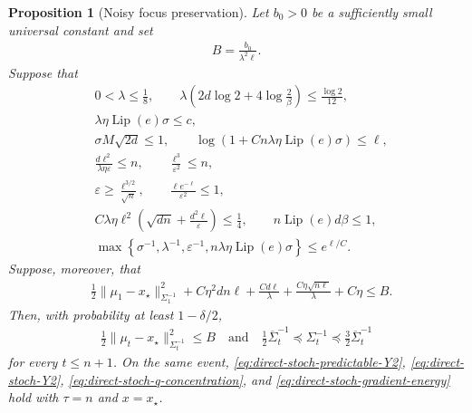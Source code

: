 \documentclass{article}
\theoremstyle{plain}
\newtheorem{proposition}[theorem]{Proposition}
\theoremstyle{definition}
\theoremstyle{plain}
\begin{document}
\begin{proposition}[Noisy focus preservation]
    \label{prop:direct-stoch-focus}
    Let $b_0>0$ be a sufficiently small universal constant and set
    \begin{align}
        B=\frac{b_0}{\lambda^2\ell}.
        \label{eq:direct-stoch-focus-B}
    \end{align}
    Suppose that
    \begin{align}
         & 0<\lambda\leq\frac18,
        \qquad
        \lambda\left(
        2d\log2+4\log\frac2\beta
        \right)\leq\frac{\log2}{12},
        \nonumber                                        \\
         & \lambda\eta\operatorname{Lip}(e)\sigma\leq c,
        \label{eq:direct-stoch-focus-basic-conditions}
        \\
         & \sigma M\sqrt{2d}\leq1,
        \qquad
        \log\left(
        1+Cn\lambda\eta\operatorname{Lip}(e)\sigma
        \right)\leq\ell,
        \nonumber                                        \\
         & \frac{d\ell^2}{\lambda\eta\varepsilon}\leq n,
        \qquad
        \frac{\ell^3}{\varepsilon^2}\leq n,
        \nonumber                                        \\
         & \varepsilon\geq\frac{\ell^{3/2}}{\sqrt n},
        \qquad
        \frac{\ell e^{-\ell}}{\varepsilon^2}\leq1,
        \label{eq:direct-stoch-focus-moment-conditions}
        \\
         & C\lambda\eta\ell^2\left(
        \sqrt{dn}+\frac{d^2\ell}{\varepsilon}
        \right)\leq\frac14,
        \qquad
        n\operatorname{Lip}(e)d\beta\leq1,
        \label{eq:direct-stoch-focus-matrix-condition}
        \\
         & \max\left\{
        \sigma^{-1},\lambda^{-1},\varepsilon^{-1},
        n\lambda\eta\operatorname{Lip}(e)\sigma
        \right\}
        \leq e^{\ell/C}.
        \label{eq:direct-stoch-focus-crude-size}
    \end{align}
    Suppose, moreover, that
    \begin{align}
         & \frac12\|\mu_1-x_\star\|_{\Sigma_1^{-1}}^2
        +C\eta^2dn\ell
        +\frac{Cd\ell}{\lambda}
        +\frac{C\eta\sqrt{n\ell}}{\lambda}
        +C\eta
        \leq B.
        \label{eq:direct-stoch-focus-budget}
    \end{align}
    Then, with probability at least $1-\delta/2$,
    \begin{align}
        \frac12\|\mu_t-x_\star\|_{\Sigma_t^{-1}}^2\leq B
        \quad\text{and}\quad
        \frac12\overline\Sigma_t^{-1}
        \preceq\Sigma_t^{-1}
        \preceq\frac32\overline\Sigma_t^{-1}
        \label{eq:direct-stoch-focus-conclusion}
    \end{align}
    for every $t\leq n+1$.
    On the same event,
    \eqref{eq:direct-stoch-predictable-Y2},
    \eqref{eq:direct-stoch-Y2},
    \eqref{eq:direct-stoch-q-concentration}, and
    \eqref{eq:direct-stoch-gradient-energy} hold with $\tau=n$ and
    $x=x_\star$.
\end{proposition}
\end{document}
